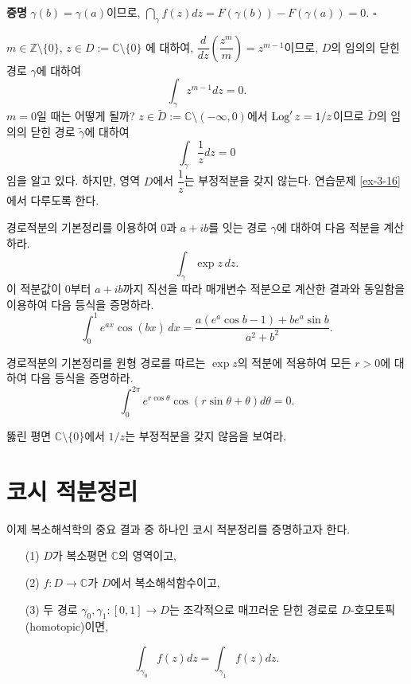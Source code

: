 {\bf 증명}
$\gamma(b)=\gamma(a)$이므로,
$\dint_\gamma f(z)dz = F(\gamma(b)) - F(\gamma(a)) = 0$.
\hfill $\square$

\begin{saltexample}[label=example-3-7]{}{}
$m\in\mathbb Z\setminus \{0\}$, $z\in D:=\mathbb C \setminus\{0\}$
에 대하여, 
$\dfrac d{dz}\left( \dfrac{z^m}m\right) = z^{m-1}$이므로,
$D$의 임의의 닫힌 경로 $\gamma$에 대하여
\[
\int_\gamma z^{m-1}dz = 0.
\]
$m=0$일 때는 어떻게 될까?
$z\in\tilde D:= \mathbb C \setminus (-\infty,0)$에서
$\mathop{\mathrm{Log}}' z = 1/z$이므로 $\tilde D$의 임의의 닫힌 경로 $\tilde \gamma$에 대하여
\[
\int_{\tilde\gamma} \frac1z dz = 0
\]
임을 알고 있다. 하지만, 영역 $D$에서 $\dfrac 1z$는 부정적분을 갖지 않는다.
연습문제 \ref{ex-3-16}에서 다루도록 한다.
\end{saltexample}

\begin{salt_exercise} \label{ex-3-14}
경로적분의 기본정리를 이용하여 
$0$과 $a+ib$를 잇는 경로 $\gamma$에 대하여
다음 적분을 계산하라.
\[
\int_\gamma \exp z \, dz.
\]
이 적분값이
$0$부터 $a+ib$까지 직선을 따라 매개변수 적분으로 계산한 결과와 동일함을 이용하여
다음 등식을 증명하라.
\[
\int_0^1 e^{ax}\cos(bx)\, dx = \dfrac{a(e^a\cos b - 1) + be^a\sin b}{a^2+b^2}.
\]
\end{salt_exercise}

\begin{salt_exercise} \label{ex-3-15}
경로적분의 기본정리를 원형 경로를 따르는 $\exp z$의 적분에  적용하여
모든 $r>0$에 대하여 다음 등식을 증명하라.
\[
\int_0^{2\pi} e^{r\cos\theta} \cos(r\sin\theta+\theta)d\theta = 0.
\]
\end{salt_exercise}

\begin{salt_exercise} \label{ex-3-16}
뚫린 평면 $\mathbb C\setminus \{0\}$에서 $1/z$는 부정적분을 갖지 않음을 보여라.
\end{salt_exercise}

\section{코시 적분정리}

이제 복소해석학의 중요 결과 중 하나인 코시 적분정리를 증명하고자 한다.

\begin{salttheorem} [코시 적분정리] {}{} \label{thm-3-4}

\begin{itemize}
\item[(1)] $D$가 복소평면 $\mathbb C$의 영역이고,
\item[(2)] $f:D\to\mathbb C$가 $D$에서 복소해석함수이고,
\item[(3)] 두 경로 $\gamma_0, \gamma_1 :[0,1]\to D$는  조각적으로 매끄러운 닫힌 경로로
$D$-호모토픽(homotopic)이면,
\end{itemize}
\[
\int_{\gamma_0} f(z)dz = \int_{\gamma_1} f(z)dz.
\]
\end{salttheorem}

